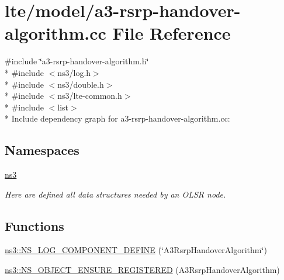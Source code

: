 \hypertarget{a3-rsrp-handover-algorithm_8cc}{}\section{lte/model/a3-\/rsrp-\/handover-\/algorithm.cc File Reference}
\label{a3-rsrp-handover-algorithm_8cc}
{\ttfamily \#include \char`\"{}a3-\/rsrp-\/handover-\/algorithm.\+h\char`\"{}}\\*
{\ttfamily \#include $<$ns3/log.\+h$>$}\\*
{\ttfamily \#include $<$ns3/double.\+h$>$}\\*
{\ttfamily \#include $<$ns3/lte-\/common.\+h$>$}\\*
{\ttfamily \#include $<$list$>$}\\*
Include dependency graph for a3-\/rsrp-\/handover-\/algorithm.cc\+:
\subsection*{Namespaces}
\begin{DoxyCompactItemize}
\item 
 \hyperlink{namespacens3}{ns3}
\begin{DoxyCompactList}\small\item\em Here are defined all data structures needed by an O\+L\+SR node. \end{DoxyCompactList}\end{DoxyCompactItemize}
\subsection*{Functions}
\begin{DoxyCompactItemize}
\item 
\hyperlink{namespacens3_ae6e9e8f70ecc305fc6d739e7bc7ed68d}{ns3\+::\+N\+S\+\_\+\+L\+O\+G\+\_\+\+C\+O\+M\+P\+O\+N\+E\+N\+T\+\_\+\+D\+E\+F\+I\+NE} (\char`\"{}A3\+Rsrp\+Handover\+Algorithm\char`\"{})
\item 
\hyperlink{namespacens3_ac7a871af0c4df0a1c4f1edf7cd30f21f}{ns3\+::\+N\+S\+\_\+\+O\+B\+J\+E\+C\+T\+\_\+\+E\+N\+S\+U\+R\+E\+\_\+\+R\+E\+G\+I\+S\+T\+E\+R\+ED} (A3\+Rsrp\+Handover\+Algorithm)
\end{DoxyCompactItemize}
